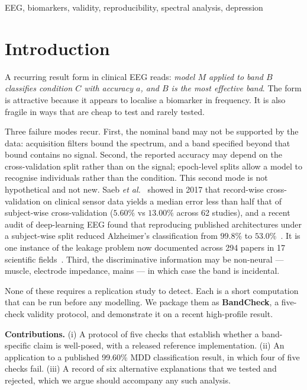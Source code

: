 \documentclass[10pt,conference]{IEEEtran}
\begin{document}
\begin{IEEEkeywords}
EEG, biomarkers, validity, reproducibility, spectral analysis, depression
\end{IEEEkeywords}

\section{Introduction}

A recurring result form in clinical EEG reads: \emph{model $M$ applied to band
$B$ classifies condition $C$ with accuracy $a$, and $B$ is the most effective
band}. The form is attractive because it appears to localise a biomarker in
frequency. It is also fragile in ways that are cheap to test and rarely tested.

Three failure modes recur. First, the nominal band may not be supported by the
data: acquisition filters bound the spectrum, and a band specified beyond that
bound contains no signal. Second, the reported accuracy may depend on the
cross-validation split rather than on the signal; epoch-level splits allow a
model to recognise individuals rather than the condition. This second mode is
not hypothetical and not new. Saeb \emph{et al.}~\cite{saeb2017} showed in 2017
that record-wise cross-validation on clinical sensor data yields a median
error less than half that of subject-wise cross-validation ($5.60\%$ vs
$13.00\%$ across 62 studies), and a recent audit of deep-learning EEG found that
reproducing published architectures under a subject-wise split reduced
Alzheimer's classification from $99.8\%$ to $53.0\%$~\cite{brookshire2024}. It
is one instance of the leakage problem now documented across 294 papers in 17
scientific fields~\cite{kapoor2023}. Third, the discriminative information may
be non-neural --- muscle, electrode impedance, mains --- in which case the band
is incidental.

None of these requires a replication study to detect. Each is a short
computation that can be run before any modelling. We package them as
\textbf{BandCheck}, a five-check validity protocol, and demonstrate it on a
recent high-profile result.

\textbf{Contributions.} (i) A protocol of five checks that establish whether a
band-specific claim is well-posed, with a released reference implementation.
(ii) An application to a published 99.60\% MDD classification result, in which
four of five checks fail. (iii) A record of six alternative explanations that we
tested and rejected, which we argue should accompany any such analysis.
\end{document}
